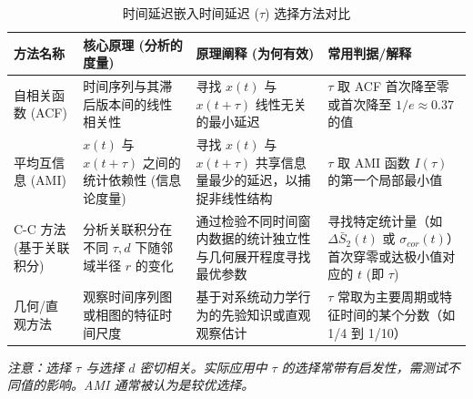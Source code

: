 \begin{table}[h!]
    \centering
    \caption{时间延迟嵌入时间延迟 ($\tau$) 选择方法对比}
    \label{tab:time_delay_tau_methods_compare_new}
    \begin{tabular}{
        >{\raggedright\arraybackslash}m{3cm}
        >{\raggedright\arraybackslash}m{4.5cm}
        >{\raggedright\arraybackslash}m{5cm}
        >{\raggedright\arraybackslash}m{4cm}
        }
        \toprule
        \textbf{方法名称}                              & \textbf{核心原理} (分析的度量)                 & \textbf{原理阐释} (为何有效)                        & \textbf{常用判据/解释}                                                                \\
        \midrule

        自相关函数 (ACF)\cite{kantz2003nonlinear}       & 时间序列与其滞后版本间的线性相关性                     & 寻找 $x(t)$ 与 $x(t+\tau)$ 线性无关的最小延迟           & $\tau$ 取 ACF 首次降至零 或首次降至 $1/e \approx 0.37$ 的值                                  \\
        \addlinespace

        平均互信息 (AMI)\cite{wallot2018calculation}    & $x(t)$ 与 $x(t+\tau)$ 之间的统计依赖性 (信息论度量) & 寻找 $x(t)$ 与 $x(t+\tau)$ 共享信息量最少的延迟，以捕捉非线性结构 & $\tau$ 取 AMI 函数 $I(\tau)$ 的第一个局部最小值                                             \\
        \addlinespace

        C-C 方法 (基于关联积分)\cite{cai2008determination} & 分析关联积分在不同 $\tau, d$ 下随邻域半径 $r$ 的变化    & 通过检验不同时间窗内数据的统计独立性与几何展开程度寻找最优参数             & 寻找特定统计量（如 $\Delta \bar{S}_2(t)$ 或 $\sigma_{cor}(t)$）首次穿零或达极小值对应的 $t$ (即 $\tau$) \\
        \addlinespace

        几何/直观方法                                    & 观察时间序列图或相图的特征时间尺度                     & 基于对系统动力学行为的先验知识或直观观察估计                      & $\tau$ 常取为主要周期或特征时间的某个分数（如 1/4 到 1/10）                                          \\
        \bottomrule
    \end{tabular}
    \par
    \vspace{0.5cm}
    \textit{注意：选择 $\tau$ 与选择 $d$ 密切相关。实际应用中 $\tau$ 的选择常带有启发性，需测试不同值的影响。AMI 通常被认为是较优选择。}
\end{table}

